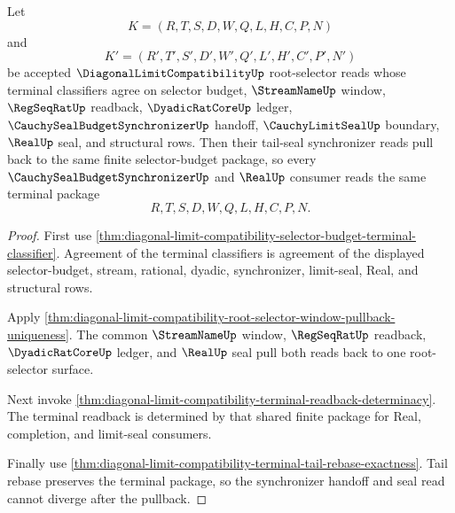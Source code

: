 \begin{theorem}
\label{thm:diagonal-limit-compatibility-tail-seal-synchronizer-pullback}
Let
$$
K=(R,T,S,D,W,Q,L,H,C,P,N)
$$
and
$$
K'=(R',T',S',D',W',Q',L',H',C',P',N')
$$
be accepted $\DiagonalLimitCompatibilityUp$ root-selector reads whose terminal classifiers agree on selector budget, $\StreamNameUp$ window, $\RegSeqRatUp$ readback, $\DyadicRatCoreUp$ ledger, $\CauchySealBudgetSynchronizerUp$ handoff, $\CauchyLimitSealUp$ boundary, $\RealUp$ seal, and structural rows. Then their tail-seal synchronizer reads pull back to the same finite selector-budget package, so every $\CauchySealBudgetSynchronizerUp$ and $\RealUp$ consumer reads the same terminal package
$$
R,T,S,D,W,Q,L,H,C,P,N .
$$
\end{theorem}
\begin{proof}
First use \autoref{thm:diagonal-limit-compatibility-selector-budget-terminal-classifier}. Agreement of the terminal classifiers is agreement of the displayed selector-budget, stream, rational, dyadic, synchronizer, limit-seal, Real, and structural rows.

Apply \autoref{thm:diagonal-limit-compatibility-root-selector-window-pullback-uniqueness}. The common $\StreamNameUp$ window, $\RegSeqRatUp$ readback, $\DyadicRatCoreUp$ ledger, and $\RealUp$ seal pull both reads back to one root-selector surface.

Next invoke \autoref{thm:diagonal-limit-compatibility-terminal-readback-determinacy}. The terminal readback is determined by that shared finite package for Real, completion, and limit-seal consumers.

Finally use \autoref{thm:diagonal-limit-compatibility-terminal-tail-rebase-exactness}. Tail rebase preserves the terminal package, so the synchronizer handoff and seal read cannot diverge after the pullback.
\end{proof}

